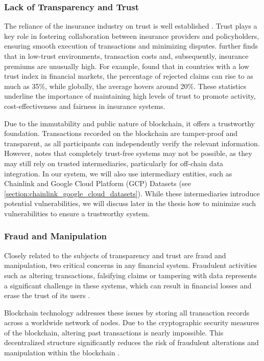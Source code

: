 \subsubsection{Lack of Transparency and Trust}
The reliance of the insurance industry on trust is well established \textcite{courbage2021trust}. Trust plays a key role in fostering collaboration between insurance providers and policyholders, ensuring smooth execution of transactions and minimizing disputes. \textcite{guiso2012trust} further finds that in low-trust environments, transaction costs and, subsequently, insurance premiums are unusually high. For example, \textcite{gennaioli2022trust} found that in countries with a low trust index in financial markets, the percentage of rejected claims can rise to as much as 35\%, while globally, the average hovers around 20\%. These statistics underline the importance of maintaining high levels of trust to promote activity, cost-effectiveness and fairness in insurance systems.

Due to the immutability and public nature of blockchain, it offers a trustworthy foundation. Transactions recorded on the blockchain are tamper-proof and transparent, as all participants can independently verify the relevant information. However, \textcite{hawlitschek2018limits} notes that completely trust-free systems may not be possible, as they may still rely on trusted intermediaries, particularly for off-chain data integration. In our system, we will also use intermediary entities, such as Chainlink and Google Cloud Platform (GCP) Datasets (see \cref{section:chainlink_google_cloud_datasets}). While these intermediaries introduce potential vulnerabilities, we will discuss later in the thesis how to minimize such vulnerabilities to ensure a trustworthy system.
 
\subsubsection{Fraud and Manipulation}
Closely related to the subjects of transparency and trust are fraud and manipulation, two critical concerns in any financial system. Fraudulent activities such as altering transactions, falsifying claims or tampering with data represents a significant challenge in these systems, which can result in financial losses and erase the trust of its users \autocite{Ahmad2024Fraud}.

Blockchain technology addresses these issues by storing all transaction records across a worldwide network of nodes. Due to the cryptographic security measures of the blockchain, altering past transactions is nearly impossible. This decentralized structure significantly reduces the risk of fraudulent alterations and manipulation within the blockchain \autocite{eigelshoven2021cryptocurrency}.


